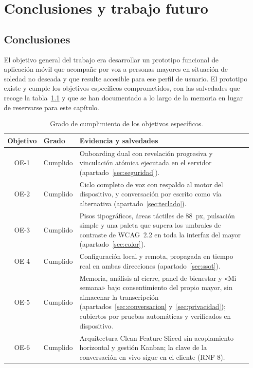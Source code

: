 \chapter{Conclusiones y trabajo futuro}
\label{cap:desarrollo-futuro}

\section{Conclusiones}
\label{sec:conclusiones}

El objetivo general del trabajo era desarrollar un prototipo funcional de aplicación móvil que acompañe por
voz a personas mayores en situación de soledad no deseada y que resulte accesible para ese perfil de usuario.
El prototipo existe y cumple los objetivos específicos comprometidos, con las salvedades que recoge la
tabla~\ref{tab:cumplimiento-oe} y que se han documentado a lo largo de la memoria en lugar de reservarse para
este capítulo.

\begin{table}[htbp]
    \centering
    \small
    \begin{tabularx}{\textwidth}{@{}c >{\RaggedRight\arraybackslash}p{} >{\RaggedRight\arraybackslash}X@{}}
        \toprule
        \textbf{Objetivo} & \textbf{Grado} & \textbf{Evidencia y salvedades} \\
        \midrule
        OE-1 & Cumplido & Onboarding dual con revelación progresiva y vinculación atómica ejecutada en el
            servidor (apartado~\ref{sec:seguridad}). \\
        \addlinespace
        OE-2 & Cumplido & Ciclo completo de voz con respaldo al motor del dispositivo, y conversación por
            escrito como vía alternativa (apartado~\ref{sec:teclado}). \\
        \addlinespace
        OE-3 & Cumplido & Pisos tipográficos, áreas táctiles de 88~px, pulsación simple y una paleta que
            supera los umbrales de contraste de WCAG~2.2 en toda la interfaz del mayor
            (apartado~\ref{sec:color}). \\
        \addlinespace
        OE-4 & Cumplido & Configuración local y remota, propagada en tiempo real en ambas direcciones
            (apartado~\ref{sec:ssot}). \\
        \addlinespace
        OE-5 & Cumplido & Memoria, análisis al cierre, panel de bienestar y «Mi semana» bajo consentimiento
            del propio mayor, sin almacenar la transcripción (apartados~\ref{sec:conversacion}
            y~\ref{sec:privacidad}); cubiertos por pruebas automáticas y verificados en dispositivo. \\
        \addlinespace
        OE-6 & Cumplido & Arquitectura Clean Feature-Sliced sin acoplamiento horizontal y gestión Kanban; la
            clave de la conversación en vivo sigue en el cliente (RNF-8). \\
        \bottomrule
    \end{tabularx}
    \caption{Grado de cumplimiento de los objetivos específicos.}
    \label{tab:cumplimiento-oe}
\end{table}


